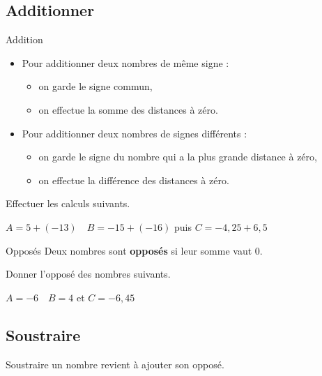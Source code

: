 \documentclass[a4paper]{book}
\begin{document}
    
\subsection{Additionner}
    
    \begin{definitionTitre}{Addition}
        \begin{itemize}
            \item Pour additionner deux nombres de même signe :
            \begin{itemize}
                \item on garde le signe commun,
                \item on effectue la somme des distances à zéro.
            \end{itemize}
            \item Pour additionner deux nombres de signes différents :
            \begin{itemize}
                \item on garde le signe du nombre qui a la plus grande distance à zéro,
                \item on effectue la différence des distances à zéro.
            \end{itemize}
        \end{itemize}
    \end{definitionTitre}
    
    \begin{exemple}
        Effectuer les calculs suivants.
        
        $A = 5+ (-13) \quad  B = -15 + (-16)$ puis $C = - 4,25 + 6,5$
    \end{exemple}

    \begin{definitionTitre}{Opposés}
        Deux nombres sont \textbf{opposés} si leur somme vaut 0.
    \end{definitionTitre}
        
    \begin{exemple}
        Donner l'opposé des nombres suivants.

        $A=-6 \quad B=4$ et $C=-6,45$
    \end{exemple}
    
\subsection{Soustraire}
    
    \begin{propriete} 
        Soustraire un nombre revient à ajouter son opposé.
    \end{propriete}
    
\end{document}
